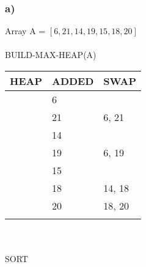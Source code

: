 \documentclass[a4paper,fleqn]{scrartcl}
\begin{document}
\subsubsection*{a)}
Array A = \([6, 21, 14, 19, 15, 18, 20]\) \\\\
BUILD-MAX-HEAP(A) \\
\begin{tabular}{l|l|l}
	HEAP & ADDED & SWAP\\
	\hline
	\hline
    [0] &  6 &      \\
	\hline
	[6] & 21 & 6, 21\\
	\hline
	[21, 6] & 14 &  \\
	\hline
	[21, 6, 14] & 19 & 6, 19\\
	\hline
	[21, 19, 14, 6] & 15 & \\
	\hline
	[21, 19, 14, 6, 15] & 18 & 14, 18\\
	\hline
	[21, 19, 18, 6, 15, 14] & 20 & 18, 20\\
	\hline
	[21, 19, 20, 6, 15, 14, 18] & & \\
\end{tabular} \\\\
SORT \\
\end{document}
